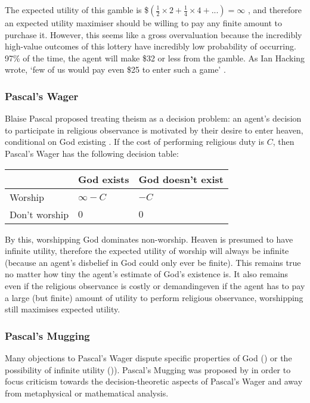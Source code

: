 \documentclass{article}
\begin{document}
The expected utility of this gamble is \$\((\frac{1}{2}\times2 + \frac{1}{4}\times4+...) = \infty\) \citep{resnik1987choices}, and therefore an expected utility maximiser should be willing to pay any finite amount to purchase it. However, this seems like a gross overvaluation because the incredibly high-value outcomes of this lottery have incredibly low probability of occurring. 97\% of the time, the agent will make \$32 or less from the gamble. As Ian Hacking wrote, `few of us would pay even \$25 to enter such
 a game' \citep{hacking1980strange}.

\subsubsection {Pascal's Wager}

Blaise Pascal proposed treating theism as a decision problem: an agent's decision to participate in religious observance is motivated by their desire to enter heaven, conditional on God existing \citep{pascal1852pensees}. If the cost of performing religious duty is \(C\), then Pascal's Wager has the following decision table:

\begin{center}
\begin{tabular}{ | l | l | l |}
  \hline
    & God exists & God doesn't exist \\ \hline
  Worship & \(\infty-C\) & \(-C\) \\ \hline
  Don't worship & \(0\)  & \(0\) \\
  \hline
\end{tabular}
\end{center}

By this, worshipping God dominates non-worship. Heaven is presumed to have infinite utility, therefore the expected utility of worship will always be infinite (because an agent's disbelief in God could only ever be finite). This remains true no matter how tiny the agent's estimate of God's existence is. It also remains even if the religious observance is costly or demanding\textemdash even if the agent has to pay a large (but finite) amount of utility to perform religious observance, worshipping still maximises expected utility.

\subsubsection {Pascal's Mugging}
Many objections to Pascal's Wager dispute specific properties of God (\citep{mackie1990miracle}) or the possibility of infinite utility (\citep{mcclennen1994pascal})). Pascal's Mugging was proposed by \citep{bostrom2009pascal} in order to focus criticism towards the decision-theoretic aspects of Pascal's Wager and away from metaphysical or mathematical analysis.
\end{document}
